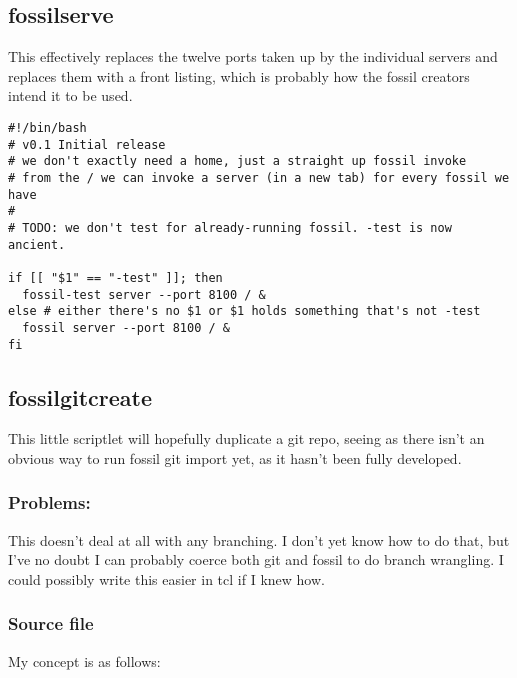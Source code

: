 \documentclass[11pt]{article}
\begin{document}
\subsection*{fossilserve}
\label{sec:org16e498d}
This effectively replaces the twelve ports taken up by the individual servers and replaces them with a front listing, which is probably how the fossil creators intend it to be used. 

\begin{verbatim}
#!/bin/bash
# v0.1 Initial release
# we don't exactly need a home, just a straight up fossil invoke
# from the / we can invoke a server (in a new tab) for every fossil we have
#
# TODO: we don't test for already-running fossil. -test is now ancient.

if [[ "$1" == "-test" ]]; then
  fossil-test server --port 8100 / &
else # either there's no $1 or $1 holds something that's not -test
  fossil server --port 8100 / &
fi
\end{verbatim}

\subsection*{fossilgitcreate}
\label{sec:orgf14e36d}
This little scriptlet will hopefully duplicate a git repo, seeing as there isn't an obvious way
to run fossil git import yet, as it hasn't been fully developed.
\subsubsection*{Problems:}
\label{sec:org796d0a2}
This doesn't deal at all with any branching. I don't yet know how to do that, but I've no doubt I can
probably coerce both git and fossil to do branch wrangling.
I could possibly write this easier in tcl if I knew how.
\subsubsection*{Source file}
\label{sec:org55bcbed}
My concept is as follows:
\end{document}

